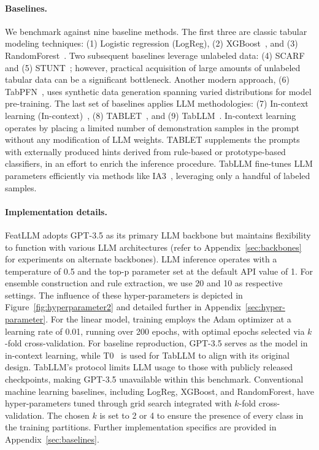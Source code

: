 \vspace*{-0.12in}
\paragraph{Baselines.}
We benchmark against nine baseline methods. The first three are classic tabular modeling techniques: (1) Logistic regression (LogReg), (2) XGBoost~\cite{chen2016xgboost}, and (3) RandomForest~\cite{ho1995random}. Two subsequent baselines leverage unlabeled data: (4) SCARF~\cite{bahri2022scarf} and (5) STUNT~\cite{nam2023stunt}; however, practical acquisition of large amounts of unlabeled tabular data can be a significant bottleneck. Another modern approach, (6) TabPFN~\cite{hollmann2022tabpfn}, uses synthetic data generation spanning varied distributions for model pre-training. The last set of baselines applies LLM methodologies: (7) In-context learning (In-context)~\cite{wei2022emergent}, (8) TABLET~\cite{slack2023tablet}, and (9) TabLLM~\cite{hegselmann2023tabllm}. In-context learning operates by placing a limited number of demonstration samples in the prompt without any modification of LLM weights. TABLET supplements the prompts with externally produced hints derived from rule-based or prototype-based classifiers, in an effort to enrich the inference procedure. TabLLM fine-tunes LLM parameters efficiently via methods like IA3~\cite{liu2022few}, leveraging only a handful of labeled samples.

\vspace*{-0.12in}
\paragraph{Implementation details.}
\textsf{FeatLLM} adopts GPT-3.5 as its primary LLM backbone but maintains flexibility to function with various LLM architectures (refer to Appendix~\ref{sec:backbones} for experiments on alternate backbones). LLM inference operates with a temperature of 0.5 and the top-p parameter set at the default API value of 1. For ensemble construction and rule extraction, we use 20 and 10 as respective settings. The influence of these hyper-parameters is depicted in Figure~\ref{fig:hyperparameter2} and detailed further in Appendix~\ref{sec:hyper-parameter}. For the linear model, training employs the Adam optimizer at a learning rate of 0.01, running over 200 epochs, with optimal epochs selected via $k$-fold cross-validation. For baseline reproduction, GPT-3.5 serves as the model in in-context learning, while T0~\cite{sanh2022multitask} is used for TabLLM to align with its original design. TabLLM's protocol limits LLM usage to those with publicly released checkpoints, making GPT-3.5 unavailable within this benchmark. Conventional machine learning baselines, including LogReg, XGBoost, and RandomForest, have hyper-parameters tuned through grid search integrated with $k$-fold cross-validation. The chosen $k$ is set to 2 or 4 to ensure the presence of every class in the training partitions. Further implementation specifics are provided in Appendix~\ref{sec:baselines}.

